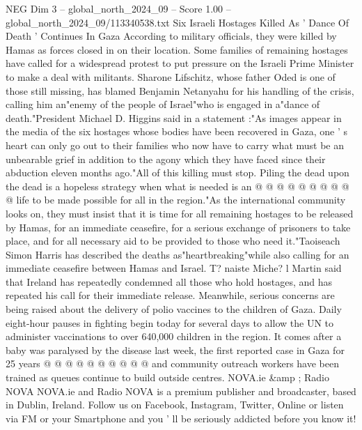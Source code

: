\begin{textsample}{NEG Dim 3 – global\_north\_2024\_09 – Score 1.00 – global\_north\_2024\_09/113340538.txt}  \label{ex:f3_neg_295}
Six Israeli Hostages Killed As ' Dance Of Death ' Continues In Gaza According to military officials, they were killed by Hamas as forces closed in on their location.
Some families of remaining hostages have called for a widespread protest to put pressure on the Israeli Prime Minister to make a deal with militants.
Sharone Lifschitz, whose father Oded is one of those still missing, has blamed Benjamin Netanyahu for his handling of the crisis, calling him an"enemy of the people of Israel"who is engaged in a"dance of death."President Michael D.
Higgins said in a statement :"As images appear in the media of the six hostages whose bodies have been recovered in Gaza, one ' s heart can only go out to their families who now have to carry what must be an unbearable grief in addition to the agony which they have faced since their abduction eleven months ago."All of this killing must stop.
Piling the dead upon the dead is a hopeless strategy when what is needed is an @ @ @ @ @ @ @ @ @ @ life to be made possible for all in the region."As the international community looks on, they must insist that it is time for all remaining hostages to be released by Hamas, for an immediate ceasefire, for a serious exchange of prisoners to take place, and for all necessary aid to be provided to those who need it."Taoiseach Simon Harris has described the deaths as"heartbreaking"while also calling for an immediate ceasefire between Hamas and Israel.
T? naiste Miche? l Martin said that Ireland has repeatedly condemned all those who hold hostages, and has repeated his call for their immediate release.
Meanwhile, serious concerns are being raised about the delivery of polio vaccines to the children of Gaza.
Daily eight-hour pauses in fighting begin today for several days to allow the UN to administer vaccinations to over 640,000 children in the region.
It comes after a baby was paralysed by the disease last week, the first reported case in Gaza for 25 years @ @ @ @ @ @ @ @ @ @ and community outreach workers have been trained as queues continue to build outside centres.
NOVA.ie \&amp ; Radio NOVA NOVA.ie and Radio NOVA is a premium publisher and broadcaster, based in Dublin, Ireland.
Follow us on Facebook, Instagram, Twitter, Online or listen via FM or your Smartphone and you ' ll be seriously addicted before you know it!

\end{textsample}
